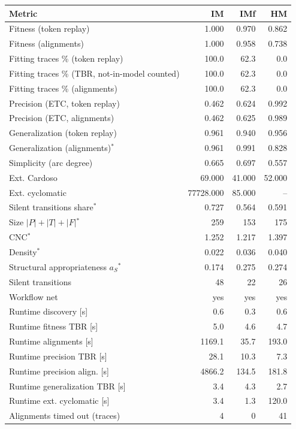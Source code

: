 \begin{tabular}{lrrr}
\toprule
Metric & IM & IMf & HM \\
\midrule
Fitness (token replay) & 1.000 & 0.970 & 0.862 \\
Fitness (alignments) & 1.000 & 0.958 & 0.738 \\
Fitting traces \% (token replay) & 100.0 & 62.3 & 0.0 \\
Fitting traces \% (TBR, not-in-model counted) & 100.0 & 62.3 & 0.0 \\
Fitting traces \% (alignments) & 100.0 & 62.3 & 0.0 \\
Precision (ETC, token replay) & 0.462 & 0.624 & 0.992 \\
Precision (ETC, alignments) & 0.462 & 0.625 & 0.989 \\
Generalization (token replay) & 0.961 & 0.940 & 0.956 \\
Generalization (alignments)$^*$ & 0.961 & 0.991 & 0.828 \\
Simplicity (arc degree) & 0.665 & 0.697 & 0.557 \\
Ext. Cardoso & 69.000 & 41.000 & 52.000 \\
Ext. cyclomatic & 77728.000 & 85.000 & -- \\
Silent transitions share$^*$ & 0.727 & 0.564 & 0.591 \\
Size $|P|+|T|+|F|$$^*$ & 259 & 153 & 175 \\
CNC$^*$ & 1.252 & 1.217 & 1.397 \\
Density$^*$ & 0.022 & 0.036 & 0.040 \\
Structural appropriateness $a_S$$^*$ & 0.174 & 0.275 & 0.274 \\
Silent transitions & 48 & 22 & 26 \\
Workflow net & yes & yes & yes \\
\midrule
Runtime discovery [s] & 0.6 & 0.3 & 0.6 \\
Runtime fitness TBR [s] & 5.0 & 4.6 & 4.7 \\
Runtime alignments [s] & 1169.1 & 35.7 & 193.0 \\
Runtime precision TBR [s] & 28.1 & 10.3 & 7.3 \\
Runtime precision align. [s] & 4866.2 & 134.5 & 181.8 \\
Runtime generalization TBR [s] & 3.4 & 4.3 & 2.7 \\
Runtime ext. cyclomatic [s] & 3.4 & 1.3 & 120.0 \\
Alignments timed out (traces) & 4 & 0 & 41 \\
\bottomrule
\end{tabular}
